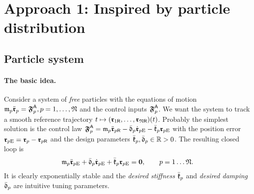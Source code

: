 
\section{Approach 1: Inspired by particle distribution}\label{sec:CtrlApproachParticles}

\subsection{Particle system}\label{sec:CtrlParticleSystem}

\paragraph{The basic idea.}
Consider a system of \textit{free} particles with the equations of motion $\mathfrak{m}_{p} \ddot{\boldsymbol{\mathfrak{r}}}_{p} = \boldsymbol{\mathfrak{F}}_{p}^{\mathsf{A}}, p=1,\ldots,\mathfrak{N}$ and the control inputs $\boldsymbol{\mathfrak{F}}_{p}^{\mathsf{A}}$.
We want the system to track a smooth reference trajectory $t\mapsto(\boldsymbol{\mathfrak{r}}_{1\mathsf{R}},\ldots,\boldsymbol{\mathfrak{r}}_{\mathfrak{N}\mathsf{R}})(t)$.
Probably the simplest solution is the control law $\boldsymbol{\mathfrak{F}}_{p}^{\mathsf{A}} = \mathfrak{m}_{p} \ddot{\boldsymbol{\mathfrak{r}}}_{p\mathsf{R}} - \bar{\mathfrak{d}}_{p} \dot{\boldsymbol{\mathfrak{r}}}_{p\mathrm{E}} - \bar{\mathfrak{k}}_{p} \boldsymbol{\mathfrak{r}}_{p\mathrm{E}}$ with the position error $\boldsymbol{\mathfrak{r}}_{p\mathrm{E}} = \boldsymbol{\mathfrak{r}}_{p} - \boldsymbol{\mathfrak{r}}_{p\mathsf{R}}$ and the design parameters $\bar{\mathfrak{k}}_{p}, \bar{\mathfrak{d}}_{p} \in \mathbb{R} > 0$.
The resulting closed loop is
\begin{align}\label{eq:MotivationGaussianCtrl}
 \mathfrak{m}_{p} \ddot{\boldsymbol{\mathfrak{r}}}_{p\mathrm{E}} + \bar{\mathfrak{d}}_{p} \dot{\boldsymbol{\mathfrak{r}}}_{p\mathrm{E}} + \bar{\mathfrak{k}}_{p} \boldsymbol{\mathfrak{r}}_{p\mathrm{E}} = \boldsymbol{0},
\qquad
 p = 1\ldots\mathfrak{N}.
\end{align}
It is clearly exponentially stable and the \textit{desired stiffness} $\bar{\mathfrak{k}}_{p}$ and \textit{desired damping} $\bar{\mathfrak{d}}_{p}$ are intuitive tuning parameters.

